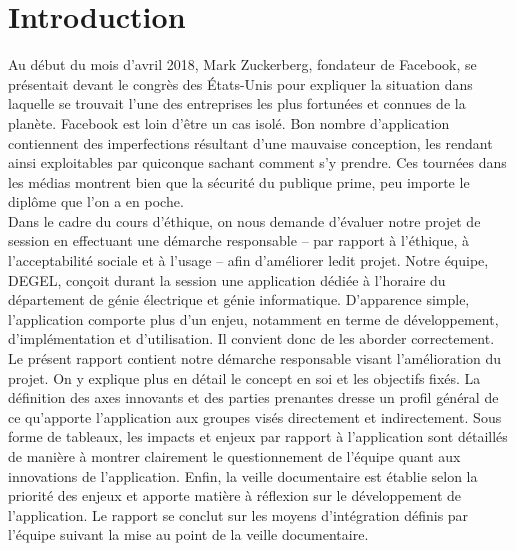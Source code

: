 \section{Introduction}
Au début du mois d'avril 2018, Mark Zuckerberg, fondateur de Facebook, se présentait devant le congrès des États-Unis pour expliquer la situation dans laquelle se trouvait l'une des entreprises les plus fortunées et connues de la planète. Facebook est loin d'être un cas isolé. Bon nombre d'application contiennent des imperfections résultant d'une mauvaise conception, les rendant ainsi exploitables par quiconque sachant comment s'y prendre. Ces tournées dans les médias montrent bien que la sécurité du publique prime, peu importe le diplôme que l'on a en poche. \\

Dans le cadre du cours d'éthique, on nous demande d'évaluer notre projet de session en effectuant une démarche responsable -- par rapport à l'éthique, à l'acceptabilité sociale et à l'usage -- afin d'améliorer ledit projet. Notre équipe, DEGEL, conçoit durant la session une application dédiée à l'horaire du département de génie électrique et génie informatique. D'apparence simple, l'application comporte plus d'un enjeu, notamment en terme de développement, d'implémentation et d'utilisation. Il convient donc de les aborder correctement. \\

Le présent rapport contient notre démarche responsable visant l'amélioration du projet. On y explique plus en détail le concept en soi et les objectifs fixés. La définition des axes innovants et des parties prenantes dresse un profil général de ce qu'apporte l'application aux groupes visés directement et indirectement. Sous forme de tableaux, les impacts et enjeux par rapport à l'application sont détaillés de manière à montrer clairement le questionnement de l'équipe quant aux innovations de l'application. Enfin, la veille documentaire est établie selon la priorité des enjeux et apporte matière à réflexion sur le développement de l'application. Le rapport se conclut sur les moyens d'intégration définis par l'équipe suivant la mise au point de la veille documentaire.
